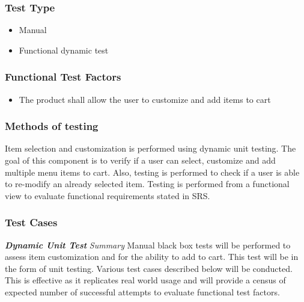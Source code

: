 \documentclass[12pt]{article}
\begin{document}
\subsubsection{Test Type}
\begin{itemize}
  \item Manual 
  \item Functional dynamic test 
 \end{itemize} 
 
\subsubsection{Functional Test Factors}
\begin{itemize}
  \item The product shall allow the user to customize and add items to cart
 \end{itemize} 
 
\subsubsection{Methods of testing}
Item selection and customization is performed using  dynamic unit testing. The goal of this component is to verify if a user can select, customize and add multiple menu items to cart. Also, testing is performed to check if a user is able to re-modify an already selected item.  Testing is performed from a functional view to evaluate functional requirements stated in SRS.

\subsubsection{Test Cases}
\textbf{\textit{Dynamic Unit Test}}\newline
\newline
\textit{Summary}\newline
Manual black box tests will be performed to assess item customization and for the ability to add to cart. This test will be in the form of unit testing. Various test cases described below will be conducted. This is effective as it replicates real world usage and will provide a census of expected number of successful attempts to evaluate functional test factors.
\end{document}
